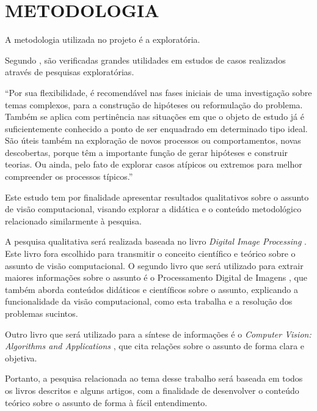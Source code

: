 \chapter{METODOLOGIA}

A metodologia utilizada no projeto é a exploratória.

Segundo , são verificadas grandes utilidades em estudos de casos realizados através de pesquisas exploratórias.

\begin{quoting}[rightmargin=0cm,leftmargin=4cm]
\begin{singlespace}
{\footnotesize  
“Por sua flexibilidade, é recomendável nas fases iniciais de uma investigação sobre temas complexos, para a construção de hipóteses ou reformulação do problema. Também se aplica com pertinência nas situações em que o objeto de estudo já é suficientemente conhecido a ponto de ser enquadrado em determinado tipo ideal. São úteis também na exploração de novos processos ou comportamentos, novas descobertas, porque têm a importante função de gerar hipóteses e construir teorias. Ou ainda, pelo fato de explorar casos atípicos ou extremos para melhor compreender os processos típicos.”
}
\end{singlespace}
\end{quoting}

Este estudo tem por finalidade apresentar resultados qualitativos sobre o assunto de visão computacional, visando explorar a didática e o conteúdo metodológico relacionado similarmente à pesquisa.

A pesquisa qualitativa será realizada baseada no livro \textit{Digital Image Processing} \cite{GONZALEZ2002}. Este livro fora escolhido para transmitir o conceito científico e teórico sobre o assunto de visão computacional. O segundo livro que será utilizado para extrair maiores informações sobre o assunto é o Processamento Digital de Imagens \cite{FILHO1999}, que também aborda conteúdos didáticos e científicos sobre o assunto, explicando a funcionalidade da visão computacional, como esta trabalha e a resolução dos problemas sucintos.

Outro livro que será utilizado para a síntese de informações é o \textit{Computer Vision: Algorithms and Applications} \cite{SZELISKI2010}, que cita relações sobre o assunto de forma clara e objetiva.

Portanto, a pesquisa relacionada ao tema desse trabalho será baseada em todos os livros descritos e alguns artigos, com a finalidade de desenvolver o conteúdo teórico sobre o assunto de forma à fácil entendimento.